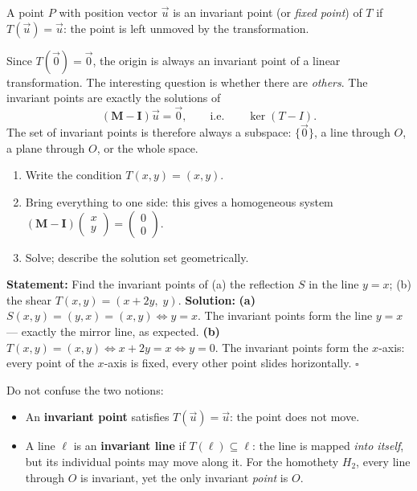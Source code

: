 \documentclass[11pt]{article}
\newcommand{\cle}[1]{{\popxbold\color{popdark}#1}}
\newcounter{popsec}
\newcounter{popsub}
\newcommand{\courssub}[1]{%
  \stepcounter{popsub}%
  \par\vspace{9pt}\noindent{\popxbold\fontsize{11.5}{13}\selectfont\color{popink}{\color{poporange}\thepopsec.\thepopsub}\hspace{6pt}#1}\par\nopagebreak\vspace{4pt}
}
\begin{document}
\courssub{Invariant (Fixed) Points}

\begin{definition}
A point $P$ with position vector $\vec{u}$ is an \cle{invariant point} (or \emph{fixed point}) of $T$ if $T(\vec{u}) = \vec{u}$: the point is left unmoved by the transformation.
\end{definition}

Since $T(\vec{0}) = \vec{0}$, the origin is always an invariant point of a linear transformation. The interesting question is whether there are \emph{others}. The invariant points are exactly the solutions of
\[
(\mathbf{M} - \mathbf{I})\vec{u} = \vec{0},
\qquad\text{i.e.}\qquad
\ker(T - I).
\]
The set of invariant points is therefore always a subspace: $\{\vec{0}\}$, a line through $O$, a plane through $O$, or the whole space.

\begin{methode}
\begin{enumerate}
    \item Write the condition $T(x,y) = (x,y)$.
    \item Bring everything to one side: this gives a homogeneous system $(\mathbf{M}-\mathbf{I})\begin{pmatrix}x\\y\end{pmatrix} = \begin{pmatrix}0\\0\end{pmatrix}$.
    \item Solve; describe the solution set geometrically.
\end{enumerate}
\end{methode}

\begin{exoresolu}
\noindent\textbf{Statement:} Find the invariant points of (a) the reflection $S$ in the line $y=x$; (b) the shear $T(x,y) = (x+2y,\; y)$.
\tcblower
\noindent\textbf{Solution:}
\textbf{(a)} $S(x,y) = (y,x) = (x,y) \iff y = x$. The invariant points form the line $y=x$ — exactly the mirror line, as expected.
\textbf{(b)} $T(x,y) = (x,y) \iff x+2y = x \iff y = 0$. The invariant points form the $x$-axis: every point of the $x$-axis is fixed, every other point slides horizontally. \hfill$\square$
\end{exoresolu}

\begin{attention}
Do not confuse the two notions:
\begin{itemize}
    \item An \textbf{invariant point} satisfies $T(\vec{u}) = \vec{u}$: the point does not move.
    \item A line $\ell$ is an \textbf{invariant line} if $T(\ell) \subseteq \ell$: the line is mapped \emph{into itself}, but its individual points may move along it. For the homothety $H_2$, every line through $O$ is invariant, yet the only invariant \emph{point} is $O$.
\end{itemize}
\end{attention}
\end{document}
